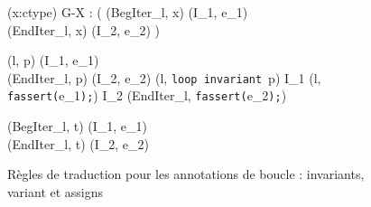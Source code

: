 \begin{figure*}[h!]
  \scriptsize{
    {
      {
        \forall (x:ctype) \in G-X :
        (
        (BegIter_l, x) \trule (I_1, e_1) \\
        (EndIter_l, x) \trule (I_2, e_2)
        )
      }
      {
         {
        }
      }{}
    }

    {
      {(l, p) \prule (I_1, e_1) \\
        (EndIter_l, p) \prule (I_2, e_2)}
      {
        (l, \mbox{\lstinline'loop invariant'}~p\semicolon) \arule
        I_1 \concat (l, \mbox{\lstinline'fassert('}e_1\mbox{\lstinline');'})
        \concat I_2 \concat
        (EndIter_l, \mbox{\lstinline'fassert('}e_2\mbox{\lstinline');'})
      }{}
    }

    {
      {
        (BegIter_l, t) \trule (I_1, e_1) \\
        (EndIter_l, t) \trule (I_2, e_2)
      }
      {
      }{}
    }
  }
  \caption{Règles de traduction pour les annotations de boucle : invariants,
    variant et assigns}
  \label{fig:loop-annot}
\end{figure*}
